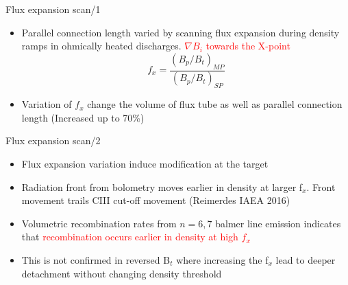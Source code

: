 \documentclass[10pt, compress]{beamer}
\newcommand\Fontvi{\fontsize{8}{7.2}\selectfont}
\begin{document}
\begin{frame}{Flux expansion scan/1}
\vspace{-1cm}
  \Fontvi
      \begin{itemize}
      \item Parallel connection length varied by scanning 
        flux expansion during density
        ramps in ohmically heated discharges. \textcolor{red}{$\nabla B_i$ towards the X-point}
        \[  f_x = \frac{(B_p/B_t)_{MP}}{(B_p/B_t)_{SP}}\]
        \item Variation of $f_x$ change the volume of flux tube as
          well as parallel connection length (Increased up to 70\%)
      \end{itemize}
\end{frame}

\begin{frame}{Flux expansion scan/2}
  \Fontvi
      \begin{itemize}
      \item<1-> Flux expansion variation induce modification at the target
      \item<1-> Radiation front from bolometry  moves earlier in
        density at larger f$_x$. Front movement trails CIII cut-off
        movement (Reimerdes IAEA 2016)
      \item<2-> Volumetric recombination rates from $n=6, 7$ balmer line
        emission \parencite{kevin:jnm} indicates that \textcolor{red}{recombination occurs
          earlier in density at high $f_x$}
      \item<3|only@3> \textcolor{ta3skyblue}{This is not confirmed in reversed B$_t$ where
        increasing the f$_x$ lead to deeper detachment without}
        changing density threshold  
    \end{itemize}
  \end{frame}
\end{document}

